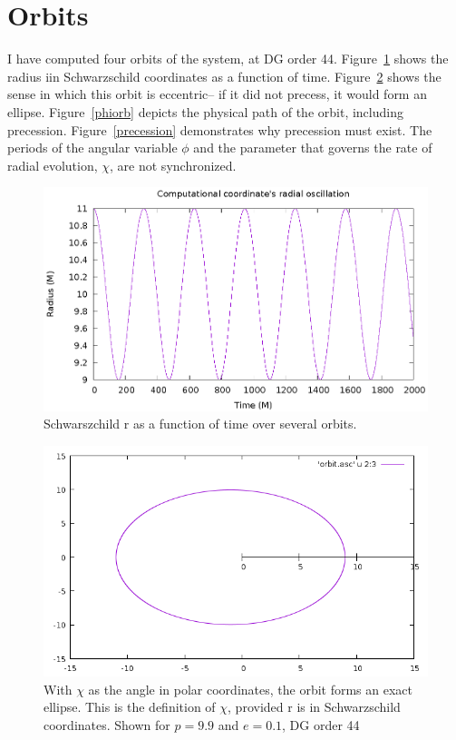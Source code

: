 \section{Orbits}

I have computed four orbits of the system, at DG order 44. Figure~\ref{rorb} shows the radius iin Schwarzschild coordinates as a function of time. Figure~\ref{chiorb} shows the sense in which this orbit is eccentric-- if it did not precess, it would form an ellipse. Figure~\ref{phiorb} depicts the physical path of the orbit, including precession. Figure~\ref{precession} demonstrates why precession must exist. The periods of the angular variable $\phi$ and the parameter that governs the rate of radial evolution, $\chi$, are not synchronized.

\begin{figure}
  \includegraphics{orbit}
  \caption{Schwarszchild r as a function of time over several orbits.}
  \label{rorb}
\end{figure}


\begin{figure}
  \includegraphics{orbitdg44p99e01}
  \caption{With $\chi$ as the angle in polar coordinates, the orbit forms an exact ellipse. This is the definition of $\chi$, provided r is in Schwarzschild coordinates. Shown for $p=9.9$ and $e=0.1$, DG order 44}
  \label{chiorb}
\end{figure}

